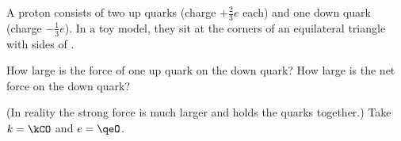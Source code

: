 A proton consists of two up quarks (charge $+\frac{2}{3}e$ each) and one down quark (charge $-\frac{1}{3}e$). In a toy model, they sit at the corners of an equilateral triangle with sides of \sqO.

\begin{abcliste}
\abc How large is the force of one up quark on the down quark?
\abc How large is the net force on the down quark?
\end{abcliste}

(In reality the strong force is much larger and holds the quarks together.) Take $k = \kCO$ and $e = \qeO$.
